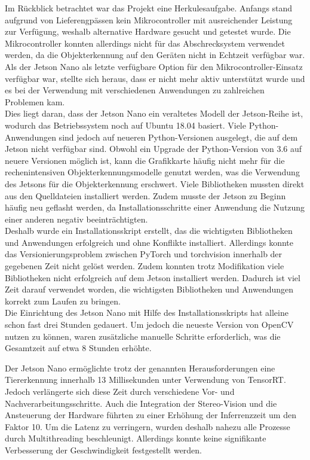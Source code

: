 
Im Rückblick betrachtet war das Projekt eine Herkulesaufgabe. Anfangs stand aufgrund von Lieferengpässen kein Mikrocontroller mit ausreichender Leistung zur Verfügung, weshalb alternative Hardware gesucht und getestet wurde. Die Mikrocontroller konnten allerdings nicht für das Abschrecksystem verwendet werden, da die Objekterkennung auf den Geräten nicht in Echtzeit verfügbar war.
\\
Als der Jetson Nano als letzte verfügbare Option für den Mikrocontroller-Einsatz verfügbar war, stellte sich heraus, dass er nicht mehr aktiv unterstützt wurde und es bei der Verwendung mit verschiedenen Anwendungen zu zahlreichen Problemen kam.
\\
Dies liegt daran, dass der Jetson Nano ein veraltetes Modell der Jetson-Reihe ist, wodurch das Betriebssystem noch auf Ubuntu 18.04 basiert. Viele Python-Anwendungen sind jedoch auf neueren Python-Versionen ausgelegt, die auf dem Jetson nicht verfügbar sind. Obwohl ein Upgrade der Python-Version von 3.6 auf neuere Versionen möglich ist, kann die Grafikkarte häufig nicht mehr für die rechenintensiven Objekterkennungsmodelle genutzt werden, was die Verwendung des Jetsons für die Objekterkennung erschwert. Viele Bibliotheken mussten direkt aus den Quelldateien installiert werden. Zudem musste der Jetson zu Beginn häufig neu geflasht werden, da Installationsschritte einer Anwendung die Nutzung einer anderen negativ beeinträchtigten.
\\
Deshalb wurde ein Installationsskript erstellt, das die wichtigsten Bibliotheken und Anwendungen erfolgreich und ohne Konflikte installiert. Allerdings konnte das Versionierungsproblem zwischen PyTorch und torchvision innerhalb der gegebenen Zeit nicht gelöst werden. Zudem konnten trotz Modifikation viele Bibliotheken nicht erfolgreich auf dem Jetson installiert werden. Dadurch ist viel Zeit darauf verwendet worden, die wichtigsten Bibliotheken und Anwendungen korrekt zum Laufen zu bringen.
\\
Die Einrichtung des Jetson Nano mit Hilfe des Installationsskripts hat alleine schon fast drei Stunden gedauert. Um jedoch die neueste Version von OpenCV nutzen zu können, waren zusätzliche manuelle Schritte erforderlich, was die Gesamtzeit auf etwa 8 Stunden erhöhte.

Der Jetson Nano ermöglichte trotz der genannten Herausforderungen eine Tiererkennung innerhalb 13 Millisekunden unter Verwendung von TensorRT. Jedoch verlängerte sich diese Zeit durch verschiedene Vor- und Nachverarbeitungsschritte. Auch die Integration der Stereo-Vision und die Ansteuerung der Hardware führten zu einer Erhöhung der Inferrenzzeit um den Faktor 10. Um die Latenz zu verringern, wurden deshalb nahezu alle Prozesse durch Multithreading beschleunigt. Allerdings konnte keine signifikante Verbesserung der Geschwindigkeit festgestellt werden.

